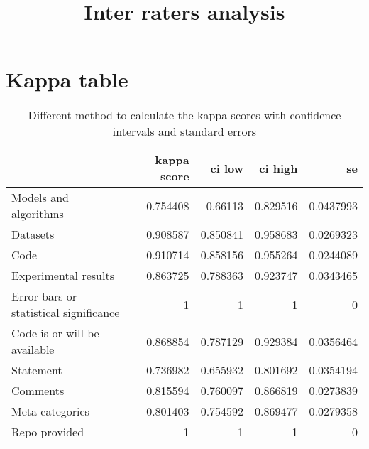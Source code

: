 \documentclass{article}
\title{Inter raters analysis}
\begin{document}
\maketitle

\section{Kappa table} 

\begin{table}[H]

\centering

\begin{tabular}{lrrrr}
\hline
                                        &   kappa score &   ci low &   ci high &        se \\
\hline
 Models and algorithms                  &      0.754408 & 0.66113  &  0.829516 & 0.0437993 \\
 Datasets                               &      0.908587 & 0.850841 &  0.958683 & 0.0269323 \\
 Code                                   &      0.910714 & 0.858156 &  0.955264 & 0.0244089 \\
 Experimental results                   &      0.863725 & 0.788363 &  0.923747 & 0.0343465 \\
 Error bars or statistical significance &      1        & 1        &  1        & 0         \\
 Code is or will be available           &      0.868854 & 0.787129 &  0.929384 & 0.0356464 \\
 Statement                              &      0.736982 & 0.655932 &  0.801692 & 0.0354194 \\
 Comments                               &      0.815594 & 0.760097 &  0.866819 & 0.0273839 \\
 Meta-categories                        &      0.801403 & 0.754592 &  0.869477 & 0.0279358 \\
 Repo provided                          &      1        & 1        &  1        & 0         \\
\hline
\end{tabular}\caption{Different method to calculate the kappa scores with confidence intervals and standard errors}

\end{table}
\end{document}
